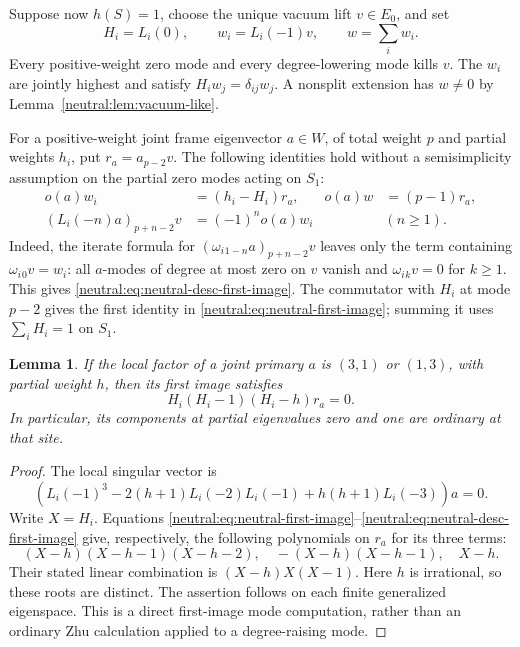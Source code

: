 \documentclass[11pt,a4paper]{article}
\numberwithin{equation}{section}
\newtheorem{lemma}[theorem]{Lemma}
\theoremstyle{definition}\newtheorem{definition}[theorem]{Definition}
\theoremstyle{remark}\newtheorem{remark}[theorem]{Remark}
\begin{document}
Suppose now $h(S)=1$, choose the unique vacuum lift $v\in E_0$, and set
\[
 H_i=L_i(0),\qquad w_i=L_i(-1)v,\qquad w=\sum_iw_i.
\]
Every positive-weight zero mode and every degree-lowering mode kills
$v$.  The $w_i$ are jointly highest and satisfy $H_iw_j=\delta_{ij}w_j$.
A nonsplit extension has $w\ne0$ by Lemma~\ref{neutral:lem:vacuum-like}.

For a positive-weight joint frame eigenvector $a\in W$, of total
weight $p$ and partial weights $h_i$, put $r_a=a_{p-2}v$.  The
following identities hold without a semisimplicity assumption on
the partial zero modes acting on $S_1$:
\begin{align}
 o(a)w_i&=(h_i-H_i)r_a,&
 o(a)w&=(p-1)r_a,\label{neutral:eq:neutral-first-image}\\
 (L_i(-n)a)_{p+n-2}v&=(-1)^n o(a)w_i
                         &&(n\geq1).\label{neutral:eq:neutral-desc-first-image}
\end{align}
Indeed, the iterate formula for
$(\omega_i{}_{1-n}a)_{p+n-2}v$ leaves only the term containing
$\omega_i{}_0v=w_i$: all $a$-modes of degree at most zero on $v$
vanish and $\omega_i{}_kv=0$ for $k\geq1$.  This gives
\eqref{neutral:eq:neutral-desc-first-image}.  The commutator with $H_i$ at
mode $p-2$ gives the first identity in
\eqref{neutral:eq:neutral-first-image}; summing it uses $\sum_iH_i=1$ on $S_1$.

\begin{lemma}\label{neutral:lem:first-image-cubic}
If the local factor of a joint primary $a$ is $(3,1)$ or $(1,3)$,
with partial weight $h$, then its first image satisfies
\[
                         H_i(H_i-1)(H_i-h)r_a=0.
\]
In particular, its components at partial eigenvalues zero and one
are ordinary at that site.
\end{lemma}

\begin{proof}
The local singular vector is
\[
 (L_i(-1)^3-2(h+1)L_i(-2)L_i(-1)+h(h+1)L_i(-3))a=0.
\]
Write $X=H_i$.  Equations
\eqref{neutral:eq:neutral-first-image}--\eqref{neutral:eq:neutral-desc-first-image}
give, respectively, the following polynomials on $r_a$ for its three
terms:
\[
 (X-h)(X-h-1)(X-h-2),\quad
 -(X-h)(X-h-1),\quad X-h.
\]
Their stated linear combination is $(X-h)X(X-1)$.  Here $h$ is
irrational, so these roots are distinct.  The assertion follows on
each finite generalized eigenspace.  This is a direct first-image
mode computation, rather than an ordinary Zhu calculation applied
to a degree-raising mode.
\end{proof}
\end{document}
